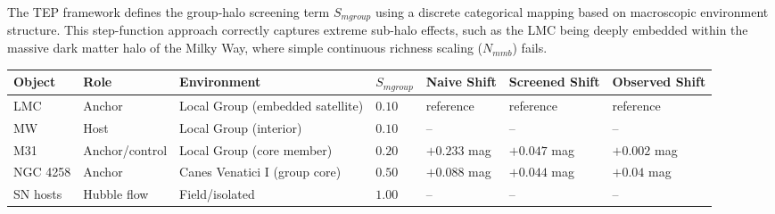 \documentclass[
]{article}
\newcounter{none} %
\begin{document}
The TEP framework defines the group-halo screening term \(S_{
m group}\) using a discrete categorical mapping based on macroscopic
environment structure. This step-function approach correctly captures
extreme sub-halo effects, such as the LMC being deeply embedded within
the massive dark matter halo of the Milky Way, where simple continuous
richness scaling (\(N_{
m mb}\)) fails.

{\def\LTcaptype{none} %
\begin{longtable}[]{@{}
  >{\raggedright\arraybackslash}p{}
  >{\raggedright\arraybackslash}p{}
  >{\raggedright\arraybackslash}p{}
  >{\raggedright\arraybackslash}p{}
  >{\raggedright\arraybackslash}p{}
  >{\raggedright\arraybackslash}p{}
  >{\raggedright\arraybackslash}p{}@{}}
\toprule\noalign{}
\begin{minipage}[b]{\linewidth}\raggedright
Object
\end{minipage} & \begin{minipage}[b]{\linewidth}\raggedright
Role
\end{minipage} & \begin{minipage}[b]{\linewidth}\raggedright
Environment
\end{minipage} & \begin{minipage}[b]{\linewidth}\raggedright
\(S_{ m group}\)
\end{minipage} & \begin{minipage}[b]{\linewidth}\raggedright
Naive Shift
\end{minipage} & \begin{minipage}[b]{\linewidth}\raggedright
Screened Shift
\end{minipage} & \begin{minipage}[b]{\linewidth}\raggedright
Observed Shift
\end{minipage} \\
\midrule\noalign{}
\endhead
\bottomrule\noalign{}
\endlastfoot
LMC & Anchor & Local Group (embedded satellite) & \(0.10\) & reference &
reference & reference \\
MW & Host & Local Group (interior) & \(0.10\) & -- & -- & -- \\
M31 & Anchor/control & Local Group (core member) & \(0.20\) & \(+0.233\)
mag & \(+0.047\) mag & \(+0.002\) mag \\
NGC 4258 & Anchor & Canes Venatici I (group core) & \(0.50\) &
\(+0.088\) mag & \(+0.044\) mag & \(+0.04\) mag \\
SN hosts & Hubble flow & Field/isolated & \(1.00\) & -- & -- & -- \\
\end{longtable}
}
\end{document}
